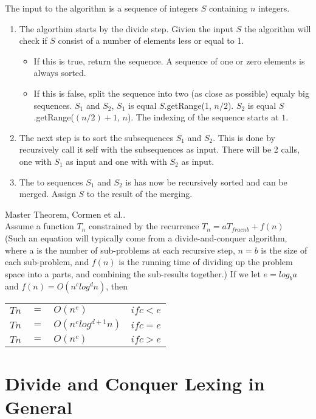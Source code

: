 The input to the algorithm is a sequence of integers $S$ containing $n$ integers. 
\begin{enumerate}
\item The algorthim starts by the divide step. Givien the input $S$ the algorithm will check if $S$ consist of a number of elements less or equal to 1.
\begin{itemize}
\item If this is true, return the sequence. A sequence of one or zero elements is always sorted.  
\item If this is false, split the sequence into two (as close as possible) equaly big sequences. $S_1$ and $S_2$, $S_1$ is equal $S$.getRange($1$, $n/2$).
$S_2$ is equal $S$.getRange($(n/2)+1$, $n$). The indexing of the sequence starts at $1$.
\end{itemize}
\item The next step is to sort the subsequences $S_1$ and $S_2$. This is done by recursively call it self with the subsequences as input. There will be 2 calls, one with $S_1$ as input and one with with $S_2$ as input.
\item The to sequences $S_1$ and $S_2$ is has now be recursively sorted and can be merged. Assign $S$ to the result of the merging.
\end{enumerate}

\begin{theorem}{Master Theorem, Cormen et al.}. \\
Assume a function
$T_n$ constrained by the recurrence
$T_n = aT_{frac{n}{b}}+ f(n)$\\
(Such an equation will typically come from a divide-and-conquer
algorithm, where a is the number of sub-problems at each recursive
step, $n=b$ is the size of each sub-problem, and $f(n)$ is the running
time of dividing up the problem space into a parts, and combining
the sub-results together.)
If we let $e = log_b a$ and $f(n) = O(n^c log^d n)$, then\\
\begin{center}
\begin{tabular}{r c l l}
$Tn$ & $=$ & $O(n^e)$ &  $if c < e$\\
$Tn$ & $=$ & $O(n^c log^{d+1} n)$ & $if c = e$\\
$Tn$ & $=$ & $O(n^c)$ & $if c > e$
\end{tabular}
\end{center}
\end{theorem}

\section{Divide and Conquer Lexing in General}

